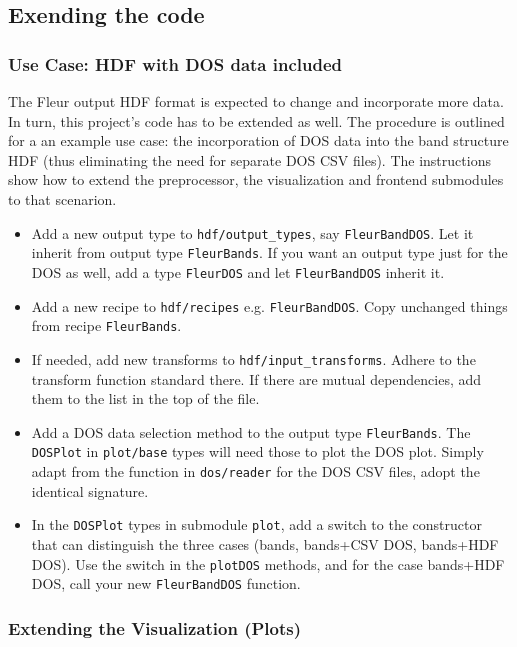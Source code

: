 \subsection{Exending the code}\label{exending-the-code}

\subsubsection{Use Case: HDF with DOS data
included}\label{use-case-hdf-with-dos-data-included}

The Fleur output HDF format is expected to change and incorporate more
data. In turn, this project's code has to be extended as well. The
procedure is outlined for a an example use case: the incorporation of
DOS data into the band structure HDF (thus eliminating the need for
separate DOS CSV files). The instructions show how to extend the
preprocessor, the visualization and frontend submodules to that
scenarion.

\begin{itemize}
\tightlist
\item
  Add a new output type to \texttt{hdf/output\_types}, say
  \texttt{FleurBandDOS}. Let it inherit from output type
  \texttt{FleurBands}. If you want an output type just for the DOS as
  well, add a type \texttt{FleurDOS} and let \texttt{FleurBandDOS}
  inherit it.
\item
  Add a new recipe to \texttt{hdf/recipes} e.g. \texttt{FleurBandDOS}.
  Copy unchanged things from recipe \texttt{FleurBands}.
\item
  If needed, add new transforms to \texttt{hdf/input\_transforms}.
  Adhere to the transform function standard there. If there are mutual
  dependencies, add them to the list in the top of the file.
\item
  Add a DOS data selection method to the output type
  \texttt{FleurBands}. The \texttt{DOSPlot} in \texttt{plot/base} types
  will need those to plot the DOS plot. Simply adapt from the function
  in \texttt{dos/reader} for the DOS CSV files, adopt the identical
  signature.
\item
  In the \texttt{DOSPlot} types in submodule \texttt{plot}, add a switch
  to the constructor that can distinguish the three cases (bands,
  bands+CSV DOS, bands+HDF DOS). Use the switch in the \texttt{plotDOS}
  methods, and for the case bands+HDF DOS, call your new
  \texttt{FleurBandDOS} function.
\end{itemize}

\subsubsection{Extending the Visualization
(Plots)}\label{extending-the-visualization-plots}

